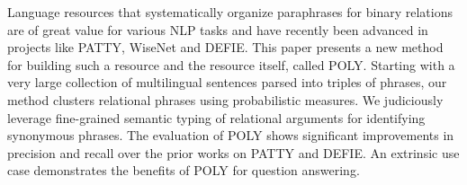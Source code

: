 Language resources that systematically organize paraphrases for binary relations are of great value for various NLP tasks and have recently been advanced in projects like PATTY, WiseNet and DEFIE. This paper presents a new method for building such a resource and the resource itself, called POLY. Starting with a very large collection of multilingual sentences parsed into triples of phrases, our method clusters relational phrases using probabilistic measures. We judiciously leverage fine-grained semantic typing of relational arguments for identifying synonymous phrases. The evaluation of POLY shows significant improvements in precision and recall over the prior works on PATTY and DEFIE. An extrinsic use case demonstrates the benefits of POLY for question answering.
